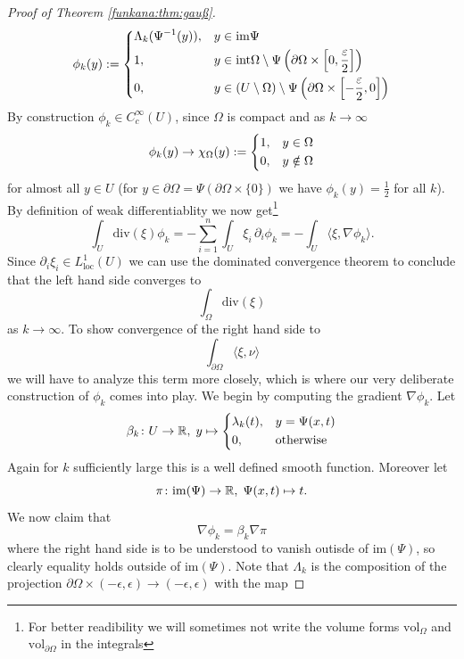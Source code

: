 \begin{proof}[Proof of Theorem \ref{funkana:thm:gauß}]
    \[
    \phi_k(y) := \begin{dcases}
        \Lambda_k(\Psi^{-1}(y)), & y \in \mathrm{im}\Psi \\
        1, & y \in \mathrm{int}\Omega \setminus \Psi\left(\partial \Omega \times \left[0,\frac{\epsilon}{2}\right]\right) \\
        0, & y \in (U\setminus\Omega) \setminus \Psi\left(\partial \Omega \times \left[-\frac{\epsilon}{2},0\right]\right)
    \end{dcases}
    \]
    By construction $\phi_k \in C_c^\infty(U)$, since $\Omega$ is compact and as $k \to \infty$
    \[
    \phi_k(y) \to \chi_\Omega(y) := \begin{dcases}
        1, & y \in \Omega \\
        0, & y \notin \Omega
    \end{dcases}
    \]
    for almost all $y \in U$ (for $y \in \partial \Omega = \Psi(\partial \Omega \times \{0\})$ we have $\phi_k(y) = \frac{1}{2}$ for all $k$). By definition of weak differentiablity we now get\footnote{For better readibility we will sometimes not write the volume forms $\mathrm{vol}_\Omega$ and $\mathrm{vol}_{\partial \Omega}$ in the integrals}
    \begin{equation}
        \label{funkana:eq:gauß_eq1}
        \int_U \mathrm{div}(\xi) \phi_k  = - \sum_{i=1}^{n} \int_U \xi_i\, \partial_i\phi_k = - \int_U\langle \xi, \nabla\phi_k \rangle.
    \end{equation}
    Since $\partial_i\xi_i \in L_{\mathrm{loc}}^1(U)$ we can use the dominated convergence theorem to conclude that the left hand side converges to 
    \[
    \int_\Omega \mathrm{div}(\xi)
    \]
    as $k\to\infty$. To show convergence of the right hand side to 
    \[
    \int_{\partial \Omega} \langle \xi,\nu\rangle
    \]
    we will have to analyze this term more closely, which is where our very deliberate construction of $\phi_k$ comes into play. We begin by computing the gradient $\nabla\phi_k$. Let 
    \[
    \beta_k \colon U \to \R, \; y \mapsto \begin{dcases}
        \lambda_k(t), & y = \Psi(x,t) \\
        0 , & \mathrm{otherwise}
    \end{dcases}
    \] 
    Again for $k$ sufficiently large this is a well defined smooth function. Moreover let 
    \[
    \pi \colon \mathrm{im}(\Psi) \to \R, \; \Psi(x,t) \mapsto t.
    \]
    We now claim that 
    \[
    \nabla \phi_k = \beta_k \nabla \pi
    \]
    where the right hand side is to be understood to vanish outisde of $\mathrm{im}(\Psi)$, so clearly equality holds outside of $\mathrm{im}(\Psi)$. Note that $\Lambda_k$ is the composition of the projection $\partial \Omega \times (-\epsilon,\epsilon) \to (-\epsilon,\epsilon) $ with the map 

\end{proof}
